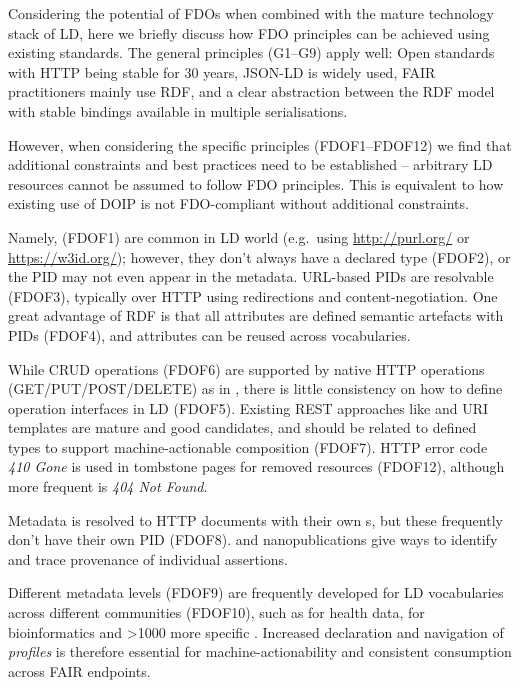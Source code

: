 Considering the potential of FDOs when combined with the mature
technology stack of LD, here we briefly discuss how FDO principles can
be achieved using existing standards. The general principles (G1--G9)
apply well: Open standards with HTTP being stable for 30 years, \acrshort{JSON-LD}
is widely used, FAIR practitioners mainly use \acrshort{RDF}, and a clear
abstraction between the RDF model with stable bindings available in
multiple serialisations.

However, when considering the specific principles (FDOF1--FDOF12) we
find that additional constraints and best practices need to be
established -- arbitrary LD resources cannot be assumed to follow FDO
principles. This is equivalent to how existing use of \acrshort{DOIP} is not
FDO-compliant without additional constraints.

Namely, 
\cite{McMurry 2017}
(FDOF1) are common in \acrshort{LD} world (e.g.~using \url{http://purl.org/} or
\url{https://w3id.org/}); however, they don't always have a declared type
(FDOF2), or the PID may not even appear in the metadata. URL-based PIDs
are resolvable (FDOF3), typically over \acrshort{HTTP} using redirections and
content-negotiation. One great advantage of \acrshort{RDF} is that all attributes
are defined semantic artefacts with PIDs (FDOF4), and attributes can be
reused across vocabularies.

While \gls{CRUD} operations (FDOF6) are supported by native HTTP operations
(GET/PUT/POST/DELETE) as in ,
there is little consistency on how to define operation interfaces in LD
(FDOF5). Existing \acrshort{REST} approaches like
 \cite{Miller 2021} and
URI templates \cite{Gregorio 2012} are mature and
good candidates, and should be related to defined types to support
machine-actionable composition (FDOF7). HTTP error code \emph{410 Gone}
is used in tombstone pages for removed resources (FDOF12), although more
frequent is \emph{404 Not Found}.

Metadata is resolved to HTTP documents with their own s, but these
frequently don't have their own PID (FDOF8).
 and nanopublications
\cite{Kuhn 2021} give ways
to identify and trace provenance of individual assertions.

Different metadata levels (FDOF9) are frequently developed for LD
vocabularies across different communities (FDOF10), such as
 for health data,
 for bioinformatics and
\textgreater1000 more specific
.
Increased declaration and navigation of \emph{profiles} is therefore
essential for machine-actionability and consistent consumption across
FAIR endpoints.

